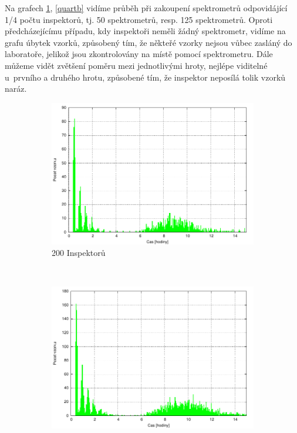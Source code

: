 \documentclass[11pt,a4paper]{article}
\begin{document}
Na grafech \ref{quarta}, \ref{quartb} vidíme průběh při zakoupení
spektrometrů odpovidájící 1/4 počtu inspektorů, tj. 50 spektrometrů, resp.
125 spektrometrů. Oproti předcházejícímu případu, kdy inspektoři neměli žádný spektrometr,
vidíme na grafu úbytek vzorků, způsobený tím, že někteřé vzorky nejsou
vůbec zasláný do laboratoře, jelikož jsou zkontrolovány na místě pomocí spektrometru.
Dále můžeme vidět zvětšení poměru mezi jednotlivými hroty, nejlépe viditelné u~prvního 
a druhého hrotu, způsobené tím, že inspektor neposílá tolik vzorků naráz.

\begin{figure}[h!]
  \centering
  \begin{subfigure}[t]{0.5\textwidth}
    \centering
    \includegraphics[width=\textwidth]{exp2_200}
    \caption{200 Inspektorů}
    \label{quarta}
  \end{subfigure}~\begin{subfigure}[t]{0.5\textwidth}
    \centering
    \includegraphics[width=\textwidth]{exp2_500}

\end{subfigure}
\end{figure}
\end{document}
